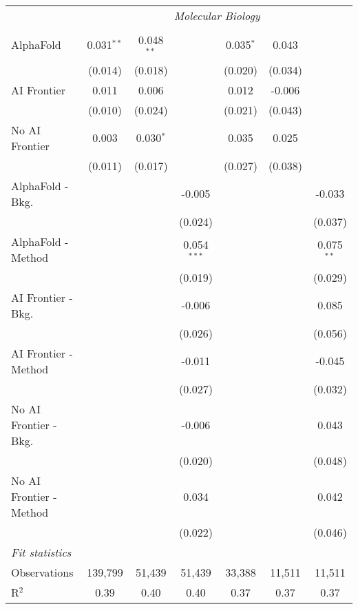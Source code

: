 \begin{tabular}{lcccccc}
 & \multicolumn{6}{c}{\textit{Molecular Biology}} \\ \\
   AlphaFold               & 0.031$^{**}$ & 0.048$^{**}$ &               & 0.035$^{*}$ & 0.043   &   \\   
                           & (0.014)      & (0.018)      &               & (0.020)     & (0.034) &   \\   
   AI Frontier             & 0.011        & 0.006        &               & 0.012       & -0.006  &   \\   
                           & (0.010)      & (0.024)      &               & (0.021)     & (0.043) &   \\   
   No AI Frontier          & 0.003        & 0.030$^{*}$  &               & 0.035       & 0.025   &   \\   
                           & (0.011)      & (0.017)      &               & (0.027)     & (0.038) &   \\   
   AlphaFold - Bkg.        &              &              & -0.005        &             &         & -0.033\\   
                           &              &              & (0.024)       &             &         & (0.037)\\   
   AlphaFold - Method      &              &              & 0.054$^{***}$ &             &         & 0.075$^{**}$\\   
                           &              &              & (0.019)       &             &         & (0.029)\\   
   AI Frontier - Bkg.      &              &              & -0.006        &             &         & 0.085\\   
                           &              &              & (0.026)       &             &         & (0.056)\\   
   AI Frontier - Method    &              &              & -0.011        &             &         & -0.045\\   
                           &              &              & (0.027)       &             &         & (0.032)\\   
   No AI Frontier - Bkg.   &              &              & -0.006        &             &         & 0.043\\   
                           &              &              & (0.020)       &             &         & (0.048)\\   
   No AI Frontier - Method &              &              & 0.034         &             &         & 0.042\\   
                           &              &              & (0.022)       &             &         & (0.046)\\   
   \midrule
   \emph{Fit statistics}\\
   Observations            & 139,799      & 51,439       & 51,439        & 33,388      & 11,511  & 11,511\\  
   R$^2$                   & 0.39         & 0.40         & 0.40          & 0.37        & 0.37    & 0.37\\  
   

\end{tabular}
